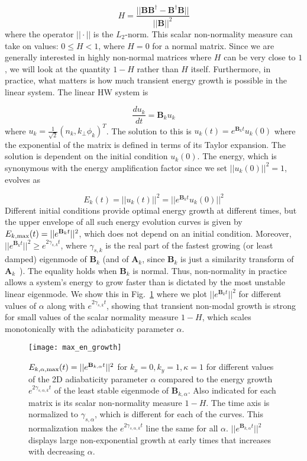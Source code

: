 \documentclass[twocolumn,showkeys,superscriptaddress]{revtex4}
\def\beq{\begin{equation}}
\def\eeq{\end{equation}}
\newcommand{\diff}[2]{\frac{d#1}{d#2}}
\begin{document}
\beq
\label{henrici_num}
H = \frac{||\mathbf{B} \mathbf{B}^\dagger - \mathbf{B}^\dagger \mathbf{B}||}{|| \mathbf{B} ||^2}
\eeq
where the operator $|| \cdot ||$ is the $L_2$-norm. This scalar non-normality measure can take on values: $0 \le H < 1$, where $H=0$ for a normal matrix. Since we are generally interested in highly non-normal
matrices where $H$ can be very close to $1$, we will look at the quantity $1-H$ rather than $H$ itself. Furthermore, in practice, what matters is how much transient energy growth is possible in the linear
system. The linear HW system is

\beq
\label{lin_HW}
\diff{u_k}{t} = \mathbf{B}_k u_k
\eeq
where $u_k = \frac{1}{\sqrt{2}} \left( n_k, k_\perp \phi_k \right)^T$.
The solution to this is $u_k(t) = e^{\mathbf{B}_k t} u_k(0)$ where the exponential of the matrix is defined in terms of
its Taylor expansion. The solution is dependent on the initial condition $u_k(0)$.
The energy, which is synonymous with the energy amplification factor since we set $||u_k(0)||^2 =1$, evolves as

\beq
\label{Et}
E_k(t) = ||u_k(t)||^2 = ||e^{\mathbf{B}_k t} u_k(0)||^2
\eeq
Different initial conditions provide optimal energy growth at different times, but the upper envelope of all such energy evolution curves is given by
$E_{k,\rm{max}}(t) = ||e^{\mathbf{B}_k t}||^2$, which does not depend on an initial condition.
Moreover, $||e^{\mathbf{B}_k t}||^2 \ge e^{2 \gamma_{s,k} t}$, where $\gamma_{s,k}$ is the real part of
the fastest growing (or least damped) eigenmode of $\mathbf{B}_k$ (and of $\mathbf{A}_k$, since $\mathbf{B}_k$ is just a similarity transform of $\mathbf{A}_k$~\cite{camargo1998}). 
The equality holds when $\mathbf{B}_k$ is normal. 
Thus, non-normality in practice allows a system's energy to grow faster than is dictated by the most unstable linear eigenmode. We show this in Fig.~\ref{max_en_growth} where we plot
$||e^{\mathbf{B}_k t}||^2$ for different values of $\alpha$ along with $e^{2 \gamma_{s,k} t}$, showing that transient non-modal growth is strong for small values of the scalar normality measure $1-H$, which scales monotonically
with the adiabaticity parameter $\alpha$.

\begin{figure}
\centerline{\texttt{[image: max\_en\_growth]}}
\caption{$E_{k,\alpha,\rm{max}}(t) = ||e^{\mathbf{B}_{k,\alpha} t}||^2$ for $k_x=0, k_y=1, \kappa=1$ for different values of the 2D adiabaticity parameter 
$\alpha$ compared to the energy growth $e^{2 \gamma_{s,\alpha,k} t}$ of the least stable eigenmode of  $\mathbf{B}_{k,\alpha}$. Also indicated for each matrix is its scalar non-normality measure $1-H$.
The time axis is normalized to $\gamma_{s,\alpha}$, which is different for each of the curves. This normalization makes the $e^{2 \gamma_{s,\alpha,k} t}$ line the same for all $\alpha$. 
$||e^{\mathbf{B}_{k,\alpha} t}||^2$ displays large non-exponential growth at early times that increases with decreasing $\alpha$.}
\label{max_en_growth}
\end{figure}
\end{document}
